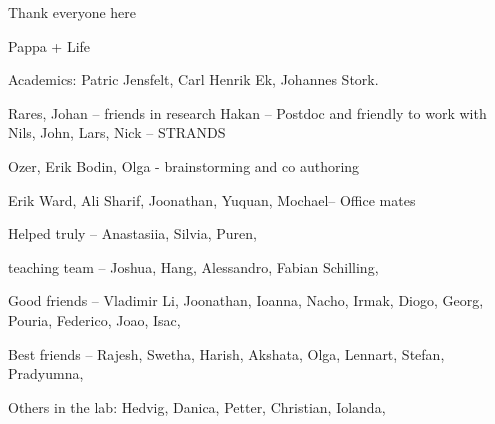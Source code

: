 Thank everyone here ~~

Pappa + Life

Academics:
Patric Jensfelt, Carl Henrik Ek, Johannes Stork. 

Rares, Johan -- friends in research
Hakan -- Postdoc and friendly to work with
Nils, John, Lars, Nick -- STRANDS

Ozer, Erik Bodin, Olga - brainstorming and co authoring

Erik Ward, Ali Sharif, Joonathan, Yuquan, Mochael-- Office mates

Helped truly -- Anastasiia, Silvia, Puren, 

teaching team -- Joshua, Hang, Alessandro, Fabian Schilling, 

Good friends -- Vladimir Li, Joonathan, Ioanna, Nacho, Irmak, Diogo, Georg, Pouria, Federico, Joao, Isac, 

Best friends -- Rajesh, Swetha, Harish, Akshata, Olga, Lennart, Stefan, Pradyumna, 

Others in the lab: 
Hedvig, Danica, Petter, Christian, Iolanda, 

\endinput
